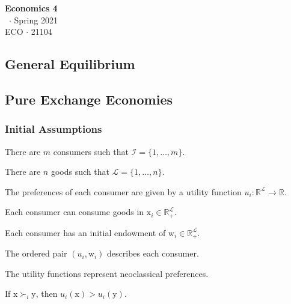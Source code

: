 \documentclass[8pt,a4paper]{extarticle}
\renewcommand{\csClass}{Economics 4}
\renewcommand{\csClassCode}{ECO $\cdot$ 21104}
\renewcommand{\csTerm}{Spring 2021}
\begin{document}
\begin{titlepage}
  \begin{center}
    \vspace*{1cm}
    \Huge
    \textbf{\csClass}
    \vspace{0.5cm} \\
    \Large
    \cs\ $\cdot$ \csTerm
    \vfill
    \csAuthorName\\
    \vspace{0.8cm}
    \csClassCode\\
    \csSchool
  \end{center}
\end{titlepage}

\begin{multicols}{3}
  \setcounter{page}{1}

  \section{General Equilibrium}

  \subsection{Pure Exchange Economies}

  \subsubsection*{Initial Assumptions}

  \begin{bulletlist}
    \item There are $m$ consumers such that $\mathcal{I} = \{1, \ldots, m\}$.
    \item There are $n$ goods such that $\mathcal{L} = \{1, \ldots, n\}$.
    \item The preferences of each consumer are given by a utility function $u_i : \mathbb{R}^\mathcal{L} \to \mathbb{R}$.
    \item Each consumer can consume goods in $\mathrm{x}_i \in \mathbb{R}_+^\mathcal{L}$.
    \item Each consumer has an initial endowment of $\mathrm{w}_i \in \mathbb{R}_+^\mathcal{L}$.
    \item The ordered pair $(u_i, \mathrm{w}_i)$ describes each consumer.
    \item The utility functions represent neoclassical preferences.
  \end{bulletlist}

  \begin{boxprop}
    If $\mathrm{x} \succ_i \mathrm{y}$, then $u_i(\mathrm{x}) > u_i(\mathrm{y})$.
  \end{boxprop}


\end{multicols}
\end{document}
